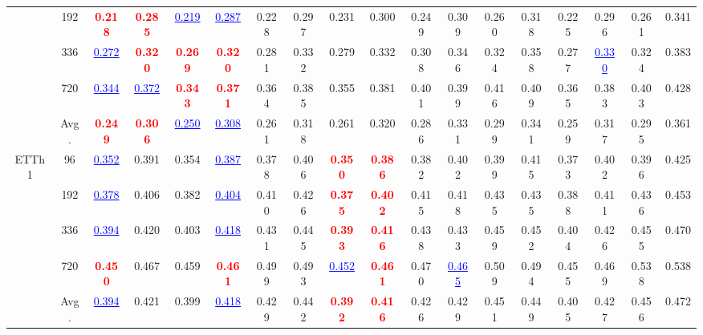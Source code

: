 \begin{table}[t]
{\begin{tabular}{cc|cc|cc|cc|cc|cc|cc|cc|cc}
 & 192 & \textcolor{red}{\textbf{0.218}} & \textcolor{red}{\textbf{0.285}} & \textcolor{blue}{\underline{0.219}} & \textcolor{blue}{\underline{0.287}} & 0.228 & 0.297 & 0.231 & 0.300 & 0.249 & 0.309 & 0.260 & 0.318 & 0.225 & 0.296 & 0.261 & 0.341 \\
 & 336 & \textcolor{blue}{\underline{0.272}} & \textcolor{red}{\textbf{0.320}} & \textcolor{red}{\textbf{0.269}} & \textcolor{red}{\textbf{0.320}} & 0.281 & 0.332 & 0.279 & 0.332 & 0.308 & 0.346 & 0.324 & 0.358 & 0.277 & \textcolor{blue}{\underline{0.330}} & 0.324 & 0.383 \\
 & 720 & \textcolor{blue}{\underline{0.344}} & \textcolor{blue}{\underline{0.372}} & \textcolor{red}{\textbf{0.343}} & \textcolor{red}{\textbf{0.371}} & 0.364 & 0.385 & 0.355 & 0.381 & 0.401 & 0.399 & 0.416 & 0.409 & 0.365 & 0.383 & 0.403 & 0.428 \\
\cmidrule(lr){2-18}
 & Avg. & \textcolor{red}{\textbf{0.249}} & \textcolor{red}{\textbf{0.306}} & \textcolor{blue}{\underline{0.250}} & \textcolor{blue}{\underline{0.308}} & 0.261 & 0.318 & 0.261 & 0.320 & 0.286 & 0.331 & 0.299 & 0.341 & 0.259 & 0.317 & 0.295 & 0.361 \\
\midrule
\multirow{5}{*}{ETTh1} & 96 & \textcolor{blue}{\underline{0.352}} & 0.391 & 0.354 & \textcolor{blue}{\underline{0.387}} & 0.378 & 0.406 & \textcolor{red}{\textbf{0.350}} & \textcolor{red}{\textbf{0.386}} & 0.382 & 0.402 & 0.399 & 0.415 & 0.373 & 0.402 & 0.396 & 0.425 \\
 & 192 & \textcolor{blue}{\underline{0.378}} & 0.406 & 0.382 & \textcolor{blue}{\underline{0.404}} & 0.410 & 0.426 & \textcolor{red}{\textbf{0.375}} & \textcolor{red}{\textbf{0.402}} & 0.415 & 0.418 & 0.435 & 0.435 & 0.388 & 0.411 & 0.436 & 0.453 \\
 & 336 & \textcolor{blue}{\underline{0.394}} & 0.420 & 0.403 & \textcolor{blue}{\underline{0.418}} & 0.431 & 0.445 & \textcolor{red}{\textbf{0.393}} & \textcolor{red}{\textbf{0.416}} & 0.438 & 0.433 & 0.459 & 0.452 & 0.404 & 0.426 & 0.455 & 0.470 \\
 & 720 & \textcolor{red}{\textbf{0.450}} & 0.467 & 0.459 & \textcolor{red}{\textbf{0.461}} & 0.499 & 0.493 & \textcolor{blue}{\underline{0.452}} & \textcolor{red}{\textbf{0.461}} & 0.470 & \textcolor{blue}{\underline{0.465}} & 0.509 & 0.494 & 0.455 & 0.469 & 0.538 & 0.538 \\
\cmidrule(lr){2-18}
 & Avg. & \textcolor{blue}{\underline{0.394}} & 0.421 & 0.399 & \textcolor{blue}{\underline{0.418}} & 0.429 & 0.442 & \textcolor{red}{\textbf{0.392}} & \textcolor{red}{\textbf{0.416}} & 0.426 & 0.429 & 0.451 & 0.449 & 0.405 & 0.427 & 0.456 & 0.472 \\

\end{tabular}}
\end{table}
